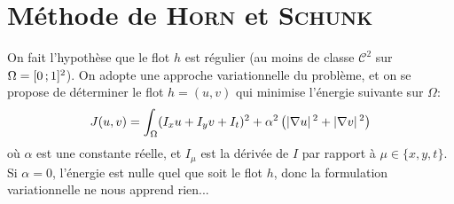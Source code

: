 \section{Méthode de \textsc{Horn} et \textsc{Schunk}}

On fait l'hypothèse que le flot $h$ est régulier (au moins de classe $\mathscr{C}^2$ sur $\Omega = \interff{0}{1}^2$). On adopte une approche variationnelle du problème, et on se propose de déterminer le flot $h = (u,v)$ qui minimise l'énergie suivante sur $\Omega$:
\[ J(u,v) = \int_{\Omega} (I_xu + I_yv + I_t)^2 + \alpha^2\left( \abs{\nabla u}^2 + \abs{\nabla v}^2 \right) \]
où $\alpha$ est une constante réelle, et $I_\mu$ est la dérivée de $I$ par rapport à $\mu \in \lbrace x, y, t \rbrace$.\\
Si $\alpha = 0$, l'énergie est nulle quel que soit le flot $h$, donc la formulation variationnelle ne nous apprend rien...

